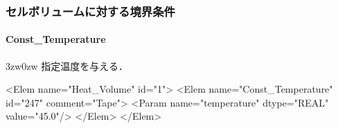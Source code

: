 %
\subsubsection{セルボリュームに対する境界条件}

\paragraph{Const\_Temperature}
\begin{indentation}{3zw}{0zw}
指定温度を与える．

{
\small
\begin{program}
<Elem name="Heat_Volume" id="1">
  <Elem name="Const_Temperature" id="247" comment="Tape">
    <Param name="temperature" dtype="REAL" value="45.0"/>
  </Elem>
</Elem>
\end{program}
}

\end{indentation}

%
